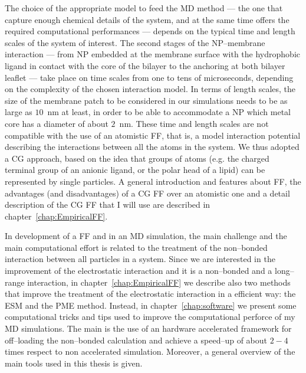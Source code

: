 The choice of the appropriate model to feed the \ac{MD} method --- the one that capture enough chemical details of the system, and at the same time offers the required computational performances --- depends on the typical time and length scales of the system of interest. The second stages of the \ac{NP}--membrane interaction --- from \ac{NP} embedded at the membrane surface with the hydrophobic ligand in contact with the core of the bilayer to the anchoring at both bilayer leaflet --- take place on time scales from one to tens of microseconds, depending on the complexity of the chosen interaction model. In terms of length scales, the size of the membrane patch to be considered in our simulations needs to be as large as $10$~nm at least, in order to be able to accommodate a \ac{NP} which metal core has a diameter of about $2$~nm. These time and length scales are not compatible with the use of an atomistic \ac{FF}, that is, a model interaction potential describing the interactions between all the atoms in the system. We thus adopted a \ac{CG} approach, based on the idea that groups of atoms (e.g. the charged terminal group of an anionic ligand, or the polar head of a lipid) can be represented by single particles. A general introduction and features about \ac{FF}, the advantages (and disadvantages) of a \ac{CG} \ac{FF} over an atomistic one and a detail description of the \ac{CG} \ac{FF} that I will use are described in chapter~\ref{chap:EmpiricalFF}.

In development of a \ac{FF} and in an \ac{MD} simulation, the main challenge and the main computational effort is related to the treatment of the non--bonded interaction between all particles in a system. Since we are interested in the improvement of the electrostatic interaction and it is a non--bonded and a long--range interaction, in chapter~\ref{chap:EmpiricalFF} we describe also two methods that improve the treatment of the electrostatic interaction in a efficient way: the \ac{ESM} and the \ac{PME} method. Instead, in chapter~\ref{chap:software} we present some computational tricks and tips used to improve the computational perforce of my \ac{MD} simulations. The main is the use of an hardware accelerated framework for off--loading the non--bonded calculation and achieve a speed--up of about $2-4$ times respect to non accelerated simulation. Moreover, a general overview of the main tools used in this thesis is given.

